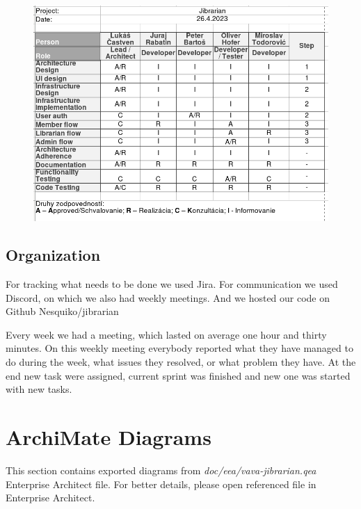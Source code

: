 \documentclass[11pt,twoside,a4paper]{article}
\begin{document}
\begin{figure}[!ht]
    \includegraphics[scale=.7]{../project-vision/RACI.png}
    \centering
\end{figure}

\subsection{Organization}

For tracking what needs to be done we used Jira. For communication we
used Discord, on which we also had weekly meetings. And we hosted our
code on Github Nesquiko/jibrarian \cite{githubGitHubNesquikojibrarian}

Every week we had a meeting, which lasted on average one hour and thirty minutes.
On this weekly meeting everybody reported what they have managed to do during the
week, what issues they resolved, or what problem they have. At the end new task
were assigned, current sprint was finished and new one was started with new tasks.

\pagebreak
\section{ArchiMate Diagrams}

This section contains exported diagrams from \emph{doc/eea/vava-jibrarian.qea}
Enterprise Architect file. For better details, please open referenced file
in Enterprise Architect.

\pagebreak
\end{document}
